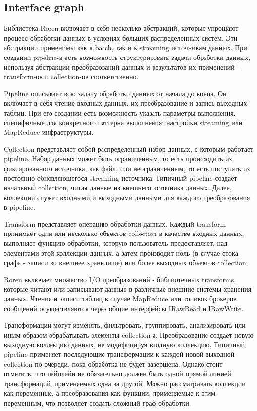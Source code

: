 \subsection{Interface graph}

Библиотека Roren включает в себя несколько абстракций, которые упрощают процесс обработки данных в условиях больших распределенных систем. Эти абстракции применимы как к batch, так и к streaming источникам данных. При создании pipeline-а есть возможность структурировать задачи обработки данных, используя абстракции преобразований данных и результатов их применений - transform-ов и collection-ов соответственно.

Pipeline описывает всю задачу обработки данных от начала до конца. Он включает в себя чтение входных данных, их преобразование и запись выходных таблиц. При его создании есть возможность указать параметры выполнения, специфичные для конкретного паттерна выполнения: настройки streaming или MapReduce инфраструктуры.

Collection представляет собой распределенный набор данных, с которым работает pipeline. Набор данных может быть ограниченным, то есть происходить из фиксированного источника, как файл, или неограниченным, то есть поступать из постоянно обновляющегося streaming источника. Типичный pipeline создает начальный collection, читая данные из внешнего источника данных. Далее, коллекции служат входными и выходными данными для каждого преобразования в pipeline.

Transform представляет операцию обработки данных. Каждый transform принимает один или несколько объектов collection в качестве входных данных, выполняет функцию обработки, которую пользователь предоставляет, над элементами этой коллекции данных, а затем производит ноль (в случае стока графа - записи во внешнее хранилище) или более выходных объектов collection.

Roren включает множество I/O преобразований - библиотечных transforms, которые читают или записывают данные в различные внешние системы хранения данных. Чтения и записи таблиц в случае MapReduce или топиков брокеров сообщений осуществляются через общие интерфейсы IRawRead и IRawWrite.

Трансформации могут изменять, фильтровать, группировать, анализировать или иным образом обрабатывать элементы collection-а. Преобразование создает новую выходную коллекцию данных, не модифицируя входную коллекцию. Типичный pipeline применяет последующие трансформации к каждой новой выходной collection по очереди, пока обработка не будет завершена. Однако стоит отметить, что пайплайн не обязательно должен быть одной прямой линией трансформаций, применяемых одна за другой. Можно рассматривать коллекции как переменные, а преобразования как функции, применяемые к этим переменным, что позволяет создать сложный граф обработки.


